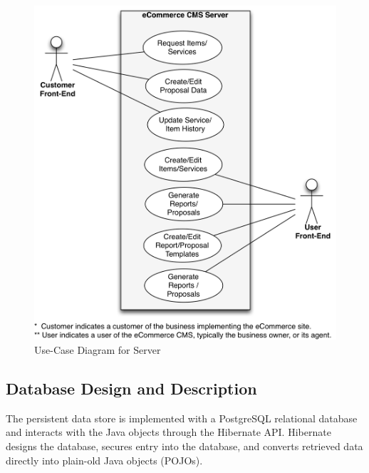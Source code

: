 \documentclass{article}
\begin{document}
\begin{figure}[H]
\centering
\includegraphics[width=4.5in]{../../UML/eccms-Use Case (Server) Diagram.png}
\caption{Use-Case Diagram for Server}
\label{server-usecase}
\end{figure}


\pagebreak
\subsection{Database Design and Description}

The persistent data store is implemented with a PostgreSQL relational database
and interacts with the Java objects through the Hibernate API.  Hibernate
designs the database, secures entry into the database, and converts retrieved
data directly into plain-old Java objects (POJOs).
\end{document}

